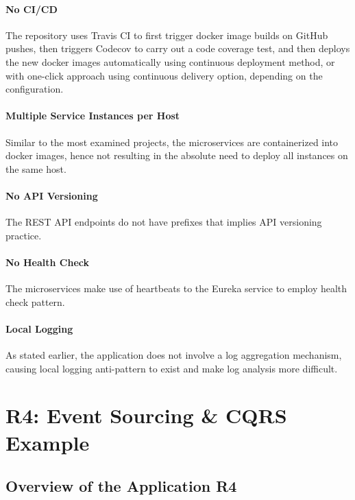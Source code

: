 \documentclass{Configuration_Files/PoliMi3i_thesis}
\begin{document}
    \paragraph{No CI/CD} The repository uses Travis CI\footnotemark[81] to first trigger docker image builds on GitHub pushes, then triggers Codecov\footnotemark[82] to carry out a code coverage test, and then deploys the new docker images automatically using continuous deployment method, or with one-click approach using continuous delivery option, depending on the configuration.
    
    \paragraph{Multiple Service Instances per Host} Similar to the most examined projects, the microservices are containerized into docker images, hence not resulting in the absolute need to deploy all instances on the same host.
    
    \paragraph{No API Versioning} The REST API endpoints do not have prefixes that implies API versioning practice.
    
    \paragraph{No Health Check} The microservices make use of heartbeats to the Eureka service to employ health check pattern.
    
    \paragraph{Local Logging} As stated earlier, the application does not involve a log aggregation mechanism, causing local logging anti-pattern to exist and make log analysis more difficult.

\section{R4: Event Sourcing \& CQRS Example}
\label{sec:R4}

\subsection{Overview of the Application R4}
\label{subsec:R4_overview}
\end{document}
